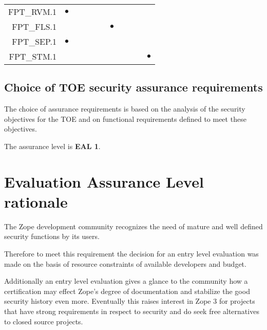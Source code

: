 \documentclass[12pt,english]{scrbook}
\newcommand{\oh}{$\bullet$}
\begin{document}
\begin{table}
\begin{tabular}{rRRRRRRRRRR}
FPT\_RVM.1          & \oh        &                &               &          &               &                        &      &                    &                 &                    \\   
FPT\_FLS.1          &            &                &               &          &               &     \oh                &      &                    &                 &                    \\   
FPT\_SEP.1          &  \oh       &                &               &          &               &                        &      &                    &                 &                    \\ 
FPT\_STM.1          &            &                &               &          &               &                        &      &                    &                 &   \oh              \\        \bottomrule
    \end{tabular}
\end{table}

\subsection{Choice of TOE security assurance requirements}

The choice of assurance requirements is based on the analysis of the security
objectives for the TOE and on functional requirements defined to meet these
objectives.

The assurance level is \textbf{EAL 1}.



\section{Evaluation Assurance Level rationale}

The Zope development community recognizes the need of mature and well defined
security functions by its users.

Therefore to meet this requirement the decision for an entry level evaluation
was made on the basis of resource constraints of available developers and
budget.

Additionally an entry level evaluation gives a glance to the community how a
certification may effect Zope's degree of documentation and stabilize the good
security history even more. Eventually this raises interest in Zope 3 for
projects that have strong requirements in respect to security and do seek free
alternatives to closed source projects.
\end{document}
